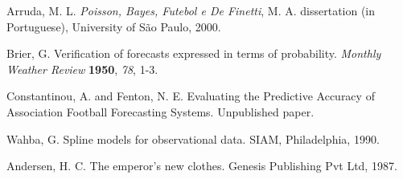 \documentclass[journal,article,accept,moreauthors,pdftex,12pt,a4paper]{mdpi}
\begin{document}













\makeatletter
\renewcommand\@biblabel[1]{#1. }
\makeatother

\begin{thebibliography}{999} %




Arruda, M. L. {\em Poisson, Bayes, Futebol e De Finetti}, M. A. dissertation (in Portuguese), University of S\~ao Paulo, 2000.

Brier, G. Verification of forecasts expressed in terms of probability. {\em Monthly Weather Review} {\bf 1950}, {\em 78}, 1-3.

Constantinou, A. and Fenton, N. E. Evaluating the Predictive Accuracy of Association Football Forecasting Systems. Unpublished paper.

Wahba, G. Spline models for observational data.
SIAM, Philadelphia, 1990.

Andersen, H.  C. The emperor's new clothes. Genesis Publishing Pvt Ltd, 1987.

\end{thebibliography}
\end{document}
